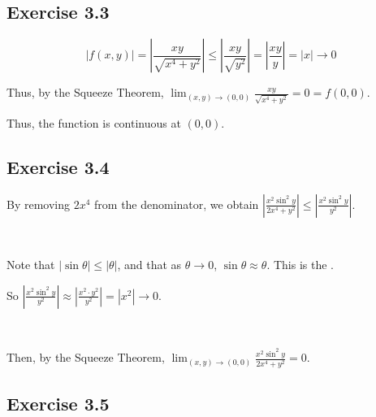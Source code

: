 \subsection*{Exercise 3.3}

$$|f(x, y)| = \left| \frac{xy}{\sqrt{x^4 + y^2}} \right| \le \left| \frac{xy}{\sqrt{y^2}} \right| = \left| \frac{xy}{y} \right| = |x| \to 0$$

Thus, by the Squeeze Theorem, $\lim_{(x,y) \to (0,0)} \frac{xy}{\sqrt{x^4 + y^2}} = 0 = f(0, 0)$. 

Thus, the function is continuous at $(0, 0)$. 

\subsection*{Exercise 3.4}

By removing $2x^4$ from the denominator, we obtain $\left| \frac{x^2 \sin^2{y}}{2x^4 + y^2} \right| \le \left| \frac{x^2 \sin^2{y}}{y^2} \right|$. 

{~~~}

Note that $| \sin{\theta} | \le | \theta |$, and that as $\theta \to 0$, $\sin \theta \approx \theta$. This is the . 

\begin{center}
\end{center}

So $\left| \frac{x^2 \sin^2{y}}{y^2} \right| \approx \left| \frac{x^2 \cdot y^2}{y^2} \right| = \left| x^2 \right| \to 0$. 

{~~~}

Then, by the Squeeze Theorem, $\lim_{(x,y) \to (0,0)} \frac{x^2 \sin^2{y}}{2x^4 + y^2} = 0$. 

\subsection*{Exercise 3.5}

